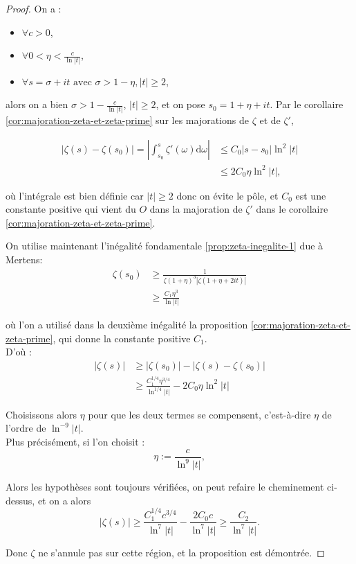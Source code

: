 \documentclass[french]{report}
\begin{document}
\begin{proof} On a :
  \begin{itemize}
    \item $\forall c>0$,
    \item $\forall 0<\eta<\frac{c}{\ln|t|}$,
    \item $\forall s=\sigma+it\,\,\mathrm{avec}\,\,\sigma>1-\eta, |t|\geq2$,
  \end{itemize}
  alors on a bien $\sigma > 1-\frac{c}{\ln|t|}$, $|t|\geq2$, et on pose $s_0=1+\eta+it$. Par le corollaire \ref{cor:majoration-zeta-et-zeta-prime} sur les majorations de $\zeta$ et de $\zeta'$,

  \begin{align*}
    |\zeta(s)-\zeta(s_0)|
    = \left|\int_{s_0}^s\zeta'(\omega)\mathrm{d}\omega\right|
    &\leq C_0|s-s_0|\ln^2|t| \\
    &\leq 2C_0\eta\ln^2|t|,
  \end{align*}
  
  où l'intégrale est bien définie car $|t|\geq2$ donc on évite le pôle, et $C_0$ est une constante positive qui vient du $O$ dans la majoration de $\zeta'$ dans le corollaire \ref{cor:majoration-zeta-et-zeta-prime}.

  On utilise maintenant l'inégalité fondamentale \ref{prop:zeta-inegalite-1} due à Mertens:
  \begin{align*}
    \zeta(s_0)
    &\geq \frac{1}{\zeta(1+\eta)^3|\zeta(1+\eta+2it)|} \\
    &\geq \frac{C_1\eta^3}{\ln|t|}
  \end{align*}

  où l'on a utilisé dans la deuxième inégalité la proposition \ref{cor:majoration-zeta-et-zeta-prime}, qui donne la constante positive $C_1$.
  \\

  D'où :
  \begin{align*}
    |\zeta(s)|
    &\geq |\zeta(s_0)| - |\zeta(s)-\zeta(s_0)| \\
    &\geq \frac{C_1^{1/4}\eta^{3/4}}{\ln^{1/4}|t|} - 2C_0\eta\ln^2|t|
  \end{align*}

  Choisissons alors $\eta$ pour que les deux termes se compensent, c'est-à-dire $\eta$ de l'ordre de $\ln^{-9}|t|$.
  \\

  Plus précisément, si l'on choisit :
  \[ \eta:=\frac{c}{\ln^9|t|}, \]

  Alors les hypothèses sont toujours vérifiées, on peut refaire le cheminement ci-dessus, et on a alors
  \[
    |\zeta(s)|
    \geq\frac{C_1^{1/4}c^{3/4}}{\ln^7|t|}-\frac{2C_0c}{\ln^7|t|}
    \geq\frac{C_2}{\ln^7|t|}.
  \]

  Donc $\zeta$ ne s'annule pas sur cette région, et la proposition est démontrée.
\end{proof}
\end{document}
